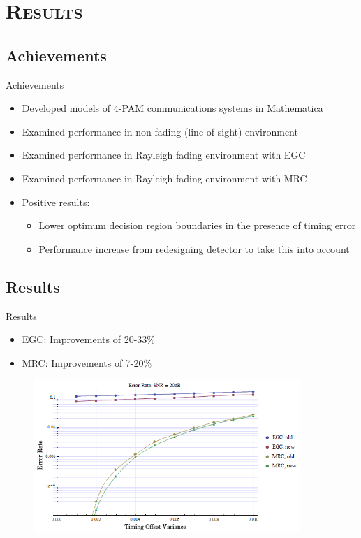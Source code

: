 \documentclass[xcolor=x11names,compress]{beamer}
\renewcommand{\(}{\begin{columns}}
\renewcommand{\)}{\end{columns}}
\newcommand{\<}[1]{\begin{column}{#1}}
\renewcommand{\>}{\end{column}}
\begin{document}
\section{\scshape Results}
\subsection{Achievements}
\begin{frame}{Achievements}
\begin{itemize}
\item<2-> Developed models of 4-PAM communications systems in Mathematica
\item<3-> Examined performance in non-fading (line-of-sight) environment
\item<4-> Examined performance in Rayleigh fading environment with EGC
\item<5-> Examined performance in Rayleigh fading environment with MRC
\item<6-> Positive results:
	\begin{itemize}
	\item Lower optimum decision region boundaries in the presence of timing error
	\item Performance increase from redesigning detector to take this into account
	\end{itemize}
\end{itemize}
\end{frame}

\subsection{Results}
\begin{frame}{Results}
\begin{itemize}
\item EGC: Improvements of 20-33\%
\item MRC: Improvements of 7-20\%
\end{itemize}
\begin{figure}[h!]
  \centering
    \includegraphics[width=0.9\textwidth]{egc_mrc_cropped.png}
\end{figure}
\end{frame}
\end{document}
